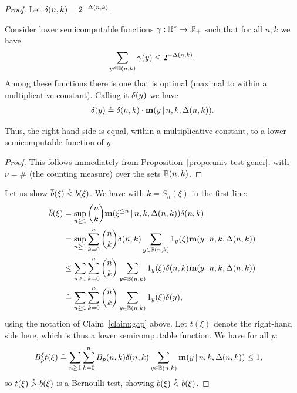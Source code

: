  \begin{proof}
Let \( \delta(n,k) = 2^{-\Delta(n,k)} \).
 \begin{claim}\label{claim:gap}
Consider lower semicomputable functions \( \gamma:\mathbb{B}^{*}\to\mathbb{R}_{+} \) such that
for all \( n,k \) we have
 \begin{align*}
   \sum_{y\in\mathbb{B}(n,k)}\gamma(y) \le 2^{-\Delta(n,k)}.
 \end{align*}
Among these functions there is one
that is optimal (maximal to within a multiplicative constant).
Calling it \( \delta(y) \) we have
 \begin{align*}
  \delta(y) \stackrel{{}_*}{=} \delta(n,k)\cdot\mathbf{m}(y\,\vert\, n,k,\Delta(n,k)).
 \end{align*}
 \end{claim}
Thus, the right-hand side is equal, within a multiplicative constant,
to a lower semicomputable function of \( y \).
 \begin{proof}
This follows immediately from Proposition~\ref{propo:univ-test-gener}.
with \( \nu=\# \) (the counting measure) over the sets \( \mathbb{B}(n,k) \).
 \end{proof}
Let us show \( \overline{b}(\xi)\stackrel{{}_*}{<} b(\xi) \).
We have with \( k=S_{n}(\xi) \) in the first line:
 \begin{align*}
 \overline{b}(\xi) &=\sup_{n\ge 1}\binom{n}{k}\mathbf{m}(\xi^{\le n}\,\vert\, n,k,\Delta(n,k))\delta(n,k)
\\ &= \sup_{n\ge 1}\sum_{k=0}^{n}\binom{n}{k}\delta(n,k)
     \sum_{y\in\mathbb{B}(n,k)}1_{y}(\xi)\mathbf{m}(y\,\vert\, n,k,\Delta(n,k))
\\ &\le \sum_{n\ge 1}\sum_{k=0}^{n}\binom{n}{k}
     \sum_{y\in\mathbb{B}(n,k)}1_{y}(\xi)\delta(n,k)\mathbf{m}(y\,\vert\, n,k,\Delta(n,k))
\\ &\stackrel{{}_*}{=} \sum_{n\ge 1}\sum_{k=0}^{n}\binom{n}{k}
     \sum_{y\in\mathbb{B}(n,k)}1_{y}(\xi)\delta(y),
 \end{align*}
using the notation of Claim~\ref{claim:gap} above.
Let \( t(\xi) \) denote the right-hand side here, which is thus
a lower semicomputable function.
We have for all \( p \):
 \begin{align*}
   B_{p}^{\xi}t(\xi) &\stackrel{{}_*}{=} \sum_{n\ge 1}\sum_{k=0}^{n}B_{p}(n,k)\delta(n,k)
 \sum_{y\in\mathbb{B}(n,k)}\mathbf{m}(y\,\vert\, n,k,\Delta(n,k)) \le 1,
 \end{align*}
so \( t(\xi)\stackrel{{}_*}{>} \overline{b}(\xi) \) is a Bernoulli test, showing \( \overline{b}(\xi)\stackrel{{}_*}{<} b(\xi) \).


\end{proof}
